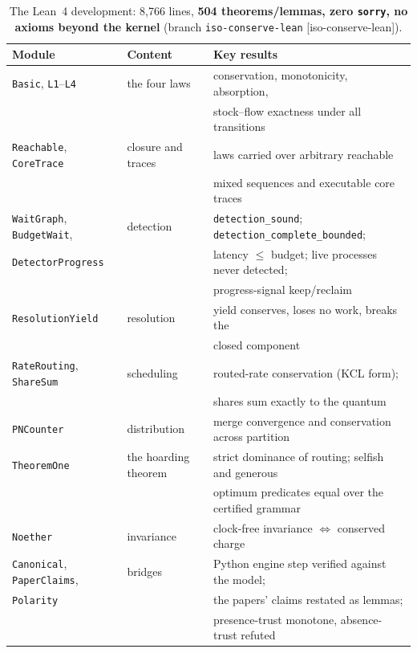 \documentclass[11pt]{article}
\begin{document}
\begin{table}[h]
\centering
\small
\begin{tabular}{lll}
\toprule
Module & Content & Key results \\
\midrule
\texttt{Basic}, \texttt{L1}--\texttt{L4} & the four laws & conservation, monotonicity, absorption, \\
& & stock--flow exactness under all transitions \\
\texttt{Reachable}, \texttt{CoreTrace} & closure and traces & laws carried over arbitrary reachable \\
& & mixed sequences and executable core traces \\
\texttt{WaitGraph}, \texttt{BudgetWait}, & detection & \texttt{detection\_sound}; \texttt{detection\_complete\_bounded}; \\
\texttt{DetectorProgress} & & latency $\le$ budget; live processes never detected; \\
& & progress-signal keep/reclaim \\
\texttt{ResolutionYield} & resolution & yield conserves, loses no work, breaks the \\
& & closed component \\
\texttt{RateRouting}, \texttt{ShareSum} & scheduling & routed-rate conservation (KCL form); \\
& & shares sum exactly to the quantum \\
\texttt{PNCounter} & distribution & merge convergence and conservation across partition \\
\texttt{TheoremOne} & the hoarding theorem & strict dominance of routing; selfish and generous \\
& & optimum predicates equal over the certified grammar \\
\texttt{Noether} & invariance & clock-free invariance $\Leftrightarrow$ conserved charge \\
\texttt{Canonical}, \texttt{PaperClaims}, & bridges & Python engine step verified against the model; \\
\texttt{Polarity} & & the papers' claims restated as lemmas; \\
& & presence-trust monotone, absence-trust refuted \\
\bottomrule
\end{tabular}
\caption{The Lean~4 development: 8{,}766 lines, \textbf{504
theorems/lemmas, zero \texttt{sorry}, no axioms beyond the kernel}
(branch \texttt{iso-conserve-lean} [iso-conserve-lean]).}
\label{tab:lean}
\end{table}
\end{document}
